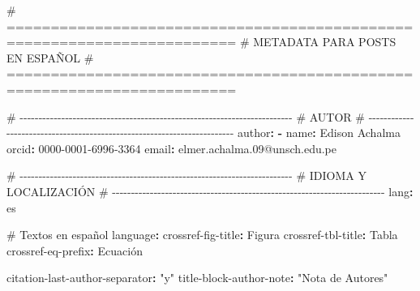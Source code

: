 \documentclass[
  doc,
  floatsintext,
  longtable,
  a4paper,
  nolmodern,
  notxfonts,
  notimes,
  12pt,
  colorlinks=true,linkcolor=blue,citecolor=blue,urlcolor=blue]{apa7}
\newenvironment{Shaded}{\begin{snugshade}}{\end{snugshade}}
\newcommand{\AttributeTok}[1]{\textcolor[rgb]{0.40,0.45,0.13}{#1}}
\newcommand{\CommentTok}[1]{\textcolor[rgb]{0.37,0.37,0.37}{#1}}
\newcommand{\FunctionTok}[1]{\textcolor[rgb]{0.28,0.35,0.67}{#1}}
\newcommand{\KeywordTok}[1]{\textcolor[rgb]{0.00,0.23,0.31}{\textbf{#1}}}
\newcommand{\StringTok}[1]{\textcolor[rgb]{0.13,0.47,0.30}{#1}}
\begin{document}
\begin{Shaded}
\begin{Highlighting}[]
\CommentTok{\# ========================================================================}
\CommentTok{\# METADATA PARA POSTS EN ESPAÑOL}
\CommentTok{\# ========================================================================}

\CommentTok{\# {-}{-}{-}{-}{-}{-}{-}{-}{-}{-}{-}{-}{-}{-}{-}{-}{-}{-}{-}{-}{-}{-}{-}{-}{-}{-}{-}{-}{-}{-}{-}{-}{-}{-}{-}{-}{-}{-}{-}{-}{-}{-}{-}{-}{-}{-}{-}{-}{-}{-}{-}{-}{-}{-}{-}{-}{-}{-}{-}{-}{-}{-}{-}{-}{-}{-}{-}{-}{-}{-}{-}{-}}
\CommentTok{\# AUTOR}
\CommentTok{\# {-}{-}{-}{-}{-}{-}{-}{-}{-}{-}{-}{-}{-}{-}{-}{-}{-}{-}{-}{-}{-}{-}{-}{-}{-}{-}{-}{-}{-}{-}{-}{-}{-}{-}{-}{-}{-}{-}{-}{-}{-}{-}{-}{-}{-}{-}{-}{-}{-}{-}{-}{-}{-}{-}{-}{-}{-}{-}{-}{-}{-}{-}{-}{-}{-}{-}{-}{-}{-}{-}{-}{-}}
\FunctionTok{author}\KeywordTok{:}
\AttributeTok{  }\KeywordTok{{-}}\AttributeTok{ }\FunctionTok{name}\KeywordTok{:}\AttributeTok{ Edison Achalma}
\AttributeTok{    }\FunctionTok{orcid}\KeywordTok{:}\AttributeTok{ 0000{-}0001{-}6996{-}3364}
\AttributeTok{    }\FunctionTok{email}\KeywordTok{:}\AttributeTok{ elmer.achalma.09@unsch.edu.pe}

\CommentTok{\# {-}{-}{-}{-}{-}{-}{-}{-}{-}{-}{-}{-}{-}{-}{-}{-}{-}{-}{-}{-}{-}{-}{-}{-}{-}{-}{-}{-}{-}{-}{-}{-}{-}{-}{-}{-}{-}{-}{-}{-}{-}{-}{-}{-}{-}{-}{-}{-}{-}{-}{-}{-}{-}{-}{-}{-}{-}{-}{-}{-}{-}{-}{-}{-}{-}{-}{-}{-}{-}{-}{-}{-}}
\CommentTok{\# IDIOMA Y LOCALIZACIÓN}
\CommentTok{\# {-}{-}{-}{-}{-}{-}{-}{-}{-}{-}{-}{-}{-}{-}{-}{-}{-}{-}{-}{-}{-}{-}{-}{-}{-}{-}{-}{-}{-}{-}{-}{-}{-}{-}{-}{-}{-}{-}{-}{-}{-}{-}{-}{-}{-}{-}{-}{-}{-}{-}{-}{-}{-}{-}{-}{-}{-}{-}{-}{-}{-}{-}{-}{-}{-}{-}{-}{-}{-}{-}{-}{-}}
\FunctionTok{lang}\KeywordTok{:}\AttributeTok{ es}

\CommentTok{\# Textos en español}
\FunctionTok{language}\KeywordTok{:}
\AttributeTok{  }\FunctionTok{crossref{-}fig{-}title}\KeywordTok{:}\AttributeTok{ Figura}
\AttributeTok{  }\FunctionTok{crossref{-}tbl{-}title}\KeywordTok{:}\AttributeTok{ Tabla}
\AttributeTok{  }\FunctionTok{crossref{-}eq{-}prefix}\KeywordTok{:}\AttributeTok{ Ecuación}

\FunctionTok{citation{-}last{-}author{-}separator}\KeywordTok{:}\AttributeTok{ }\StringTok{"y"}
\FunctionTok{title{-}block{-}author{-}note}\KeywordTok{:}\AttributeTok{ }\StringTok{"Nota de Autores"}


\end{Highlighting}
\end{Shaded}
\end{document}
